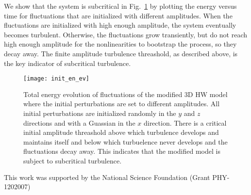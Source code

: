 \documentclass[letter,scriptaddress,twocolumn, prl,showkeys]{revtex4}
\begin{document}
We show that the system is subcritical in Fig.~\ref{init_en_ev} by plotting the energy versus time for fluctuations that are initialized with different amplitudes. When the fluctuations are initialized
with high enough amplitude, the system eventually becomes turbulent. Otherwise, the fluctuations grow transiently, but do not reach high enough amplitude for the nonlinearities to bootstrap the process,
so they decay away. The finite amplitude turbulence threashold, as described above, is the key indicator of subcritical turbulence.

\begin{figure}
\centerline{\texttt{[image: init\_en\_ev]}}
\caption{Total energy evolution of fluctuations of the modified 3D HW model where the initial perturbations are set to different amplitudes. All initial perturbations are initialized randomly in
the $y$ and $z$ directions and with a Guassian in the $x$ direction. There is a critical initial amplitude threashold above which turbulence develops and maintains itself
and below which turbuelence never develops and the fluctuations decay away. This indicates that the modified model is subject to subcritical turbulence.}
\label{init_en_ev}
\end{figure}


\begin{acknowledgments}
This work was supported by the National Science Foundation (Grant PHY-1202007)
\end{acknowledgments}


%

\end{document}
